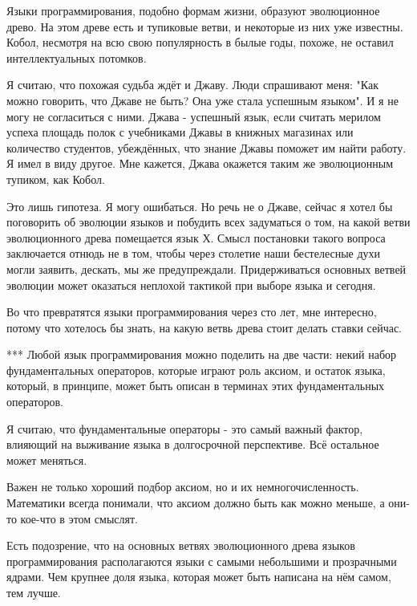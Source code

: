 \documentclass[ebook,12pt,oneside,openany]{memoir}
\author{Пол Грэм} \date{}
\begin{document}
\maketitle

Языки программирования, подобно формам жизни, образуют эволюционное
древо. На этом древе есть и тупиковые ветви, и некоторые из них уже
известны. Кобол, несмотря на всю свою популярность в былые годы,
похоже, не оставил интеллектуальных потомков.

Я считаю, что похожая судьба ждёт и Джаву. Люди спрашивают меня: "Как
можно говорить, что Джаве не быть? Она уже стала успешным языком". И я
не могу не согласиться с ними. Джава - успешный язык, если считать
мерилом успеха площадь полок с учебниками Джавы в книжных магазинах
или количество студентов, убеждённых, что знание Джавы поможет им
найти работу. Я имел в виду другое. Мне кажется, Джава окажется таким
же эволюционным тупиком, как Кобол.

Это лишь гипотеза. Я могу ошибаться. Но речь не о Джаве, сейчас я
хотел бы поговорить об эволюции языков и побудить всех задуматься о
том, на какой ветви эволюционного древа помещается язык Х. Смысл
постановки такого вопроса заключается отнюдь не в том, чтобы через
столетие наши бестелесные духи могли заявить, дескать, мы же
предупреждали. Придерживаться основных ветвей эволюции может оказаться
неплохой тактикой при выборе языка и сегодня.

Во что превратятся языки программирования через сто лет, мне
интересно, потому что хотелось бы знать, на какую ветвь древа стоит
делать ставки сейчас.

*** Любой язык программирования можно поделить на две части: некий
набор фундаментальных операторов, которые играют роль аксиом, и
остаток языка, который, в принципе, может быть описан в терминах этих
фундаментальных операторов.

Я считаю, что фундаментальные операторы - это самый важный фактор,
влияющий на выживание языка в долгосрочной перспективе. Всё остальное
может меняться.

Важен не только хороший подбор аксиом, но и их немногочисленность.
Математики всегда понимали, что аксиом должно быть как можно меньше, а
они-то кое-что в этом смыслят.

Есть подозрение, что на основных ветвях эволюционного древа языков
программирования располагаются языки с самыми небольшими и прозрачными
ядрами. Чем крупнее доля языка, которая может быть написана на нём
самом, тем лучше.
\end{document}
